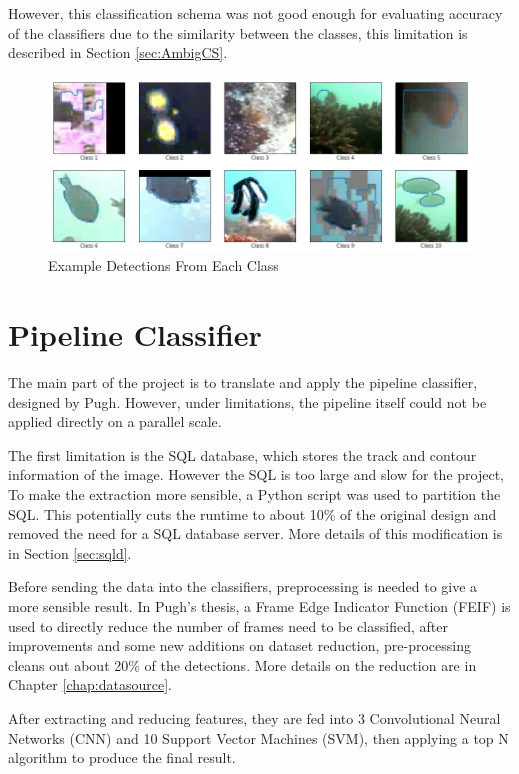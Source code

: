\documentclass[bsc,logo,twoside,fullspacing,parskip]{infthesis}
\begin{document}
However, this classification schema was not good enough for evaluating accuracy of the classifiers due to the similarity between the classes, this limitation is described in Section \ref{sec:AmbigCS}.

\begin{figure}
    \centering
    \includegraphics[scale=0.4]{graph/class_sample.png}
    \caption{Example Detections From Each Class}
    \label{fig:classes}
\end{figure}

\section{Pipeline Classifier}

The main part of the project is to translate and apply the pipeline classifier, designed by Pugh\cite{P1}. 
However, under limitations, the pipeline itself could not be applied directly on a parallel scale.

The first limitation is the SQL database, which stores the track and contour information of the image. 
However the SQL is too large and slow for the project, To make the extraction more sensible, a Python script was used to partition the SQL.
This potentially cuts the runtime to about 10\% of the original design and removed the need for a SQL database server. 
More details of this modification is in Section \ref{sec:sqld}.

Before sending the data into the classifiers, preprocessing is needed to give a more sensible result.
In Pugh's thesis\cite{P1}, a Frame Edge Indicator Function (FEIF) is used to directly reduce the number of frames need to be classified, after improvements and some new additions on dataset reduction, pre-processing cleans out about 20\% of the detections. More details on the reduction are in Chapter \ref{chap:datasource}.

After extracting and reducing features, they are fed into 3 Convolutional Neural Networks (CNN) and 10 Support Vector Machines (SVM), then applying a top N algorithm to produce the final result. 
\end{document}
